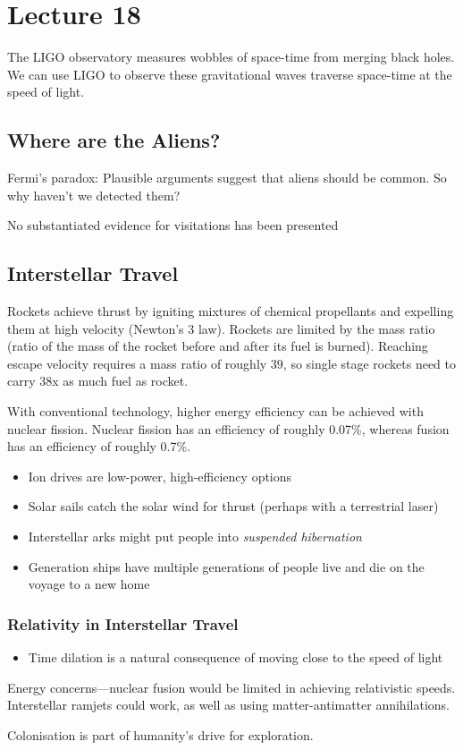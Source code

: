 \documentclass[class=article, crop=false]{standalone}
\begin{document}
  \section{Lecture 18}
  The LIGO observatory measures wobbles of space-time from merging black holes. We can use LIGO to observe these gravitational waves traverse space-time at the speed of light.
  \subsection{Where are the Aliens?}
  Fermi's paradox: Plausible arguments suggest that aliens should be common. So why haven't we detected them? \par
  No substantiated evidence for visitations has been presented
  \subsection{Interstellar Travel}
  Rockets achieve thrust by igniting mixtures of chemical propellants and expelling them at high velocity (Newton's 3 law). Rockets are limited by the mass ratio (ratio of the mass of the rocket before and after its fuel is burned). Reaching escape velocity requires a mass ratio of roughly $39$, so single stage rockets need to carry 38x as much fuel as rocket. \par
  With conventional technology, higher energy efficiency can be achieved with nuclear fission. Nuclear fission has an efficiency of roughly 0.07\%, whereas fusion has an efficiency of roughly 0.7\%.
  \begin{itemize}
    \item Ion drives are low-power, high-efficiency options
    \item Solar sails catch the solar wind for thrust (perhaps with a terrestrial laser)
    \item Interstellar arks might put people into \emph{suspended hibernation}
    \item Generation ships have multiple generations of people live and die on the voyage to a new home
  \end{itemize}
  \subsubsection{Relativity in Interstellar Travel}
  \begin{itemize}
    \item Time dilation is a natural consequence of moving close to the speed of light
  \end{itemize}
  Energy concerns---nuclear fusion would be limited in achieving relativistic speeds. Interstellar ramjets could work, as well as using matter-antimatter annihilations. \par
  Colonisation is part of humanity's drive for exploration.
\end{document}

